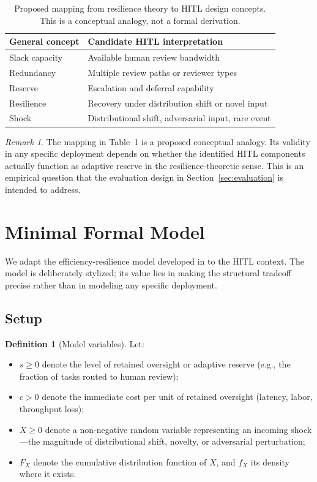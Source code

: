 \documentclass[11pt,a4paper]{article}
\theoremstyle{definition}
\newtheorem{definition}{Definition}
\theoremstyle{plain}
\theoremstyle{remark}
\newtheorem{remark}{Remark}
\begin{document}
\begin{table}[h]
\centering
\begin{tabularx}{\linewidth}{lX}
\toprule
\textbf{General concept} & \textbf{Candidate HITL interpretation} \\
\midrule
Slack capacity & Available human review bandwidth \\
Redundancy & Multiple review paths or reviewer types \\
Reserve & Escalation and deferral capability \\
Resilience & Recovery under distribution shift or novel input \\
Shock & Distributional shift, adversarial input, rare event \\
\bottomrule
\end{tabularx}
\caption{Proposed mapping from resilience theory to HITL design concepts. This is a conceptual analogy, not a formal derivation.}
\end{table}

\begin{remark}
The mapping in Table~1 is a proposed conceptual analogy. Its validity in any specific deployment depends on whether the identified HITL components actually function as adaptive reserve in the resilience-theoretic sense. This is an empirical question that the evaluation design in Section~\ref{sec:evaluation} is intended to address.
\end{remark}

\section{Minimal Formal Model}

We adapt the efficiency-resilience model developed in \citet{toumanidis2026a} to the HITL context. The model is deliberately stylized; its value lies in making the structural tradeoff precise rather than in modeling any specific deployment.

\subsection{Setup}

\begin{definition}[Model variables]
Let:
\begin{itemize}
  \item $s \geq 0$ denote the level of retained oversight or adaptive reserve (e.g., the fraction of tasks routed to human review);
  \item $c > 0$ denote the immediate cost per unit of retained oversight (latency, labor, throughput loss);
  \item $X \geq 0$ denote a non-negative random variable representing an incoming shock---the magnitude of distributional shift, novelty, or adversarial perturbation;
  \item $F_X$ denote the cumulative distribution function of $X$, and $f_X$ its density where it exists.
\end{itemize}
\end{definition}
\end{document}
